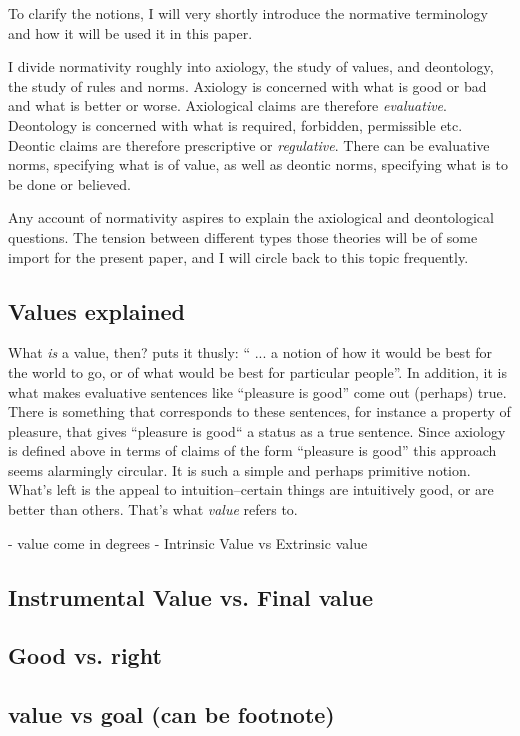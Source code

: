 \documentclass[12pt,numbers=noenddot]{scrartcl}
\begin{document}
To clarify the notions, I will very shortly introduce the normative terminology and how it will be used it in this paper.

I divide normativity roughly into axiology, the study of values, and deontology, the study of rules and norms. Axiology is concerned with what is good or bad and what is better or worse. Axiological claims are therefore \emph{evaluative}. Deontology is concerned with what is required, forbidden, permissible etc. Deontic claims are therefore prescriptive or \emph{regulative}. There can be evaluative norms, specifying what is of value, as well as deontic norms, specifying what is to be done or believed.

Any account of normativity aspires to explain the axiological and deontological questions. The tension between different types those theories will be of some import for the present paper, and I will circle back to this topic frequently.

\subsection{ Values explained }
What \emph{is} a value, then? \textcite[79]{scanlon1998} puts it thusly: “ ... a notion of how it would be best for the world to go, or of what would be best for particular people”. In addition, it is what makes evaluative sentences like “pleasure is good” come out (perhaps) true. There is something that corresponds to these sentences, for instance a property of pleasure, that gives “pleasure is good“ a status as a true sentence. Since axiology is defined above in terms of claims of the form “pleasure is good” this approach seems alarmingly circular. It is such a simple and perhaps primitive notion. What's left is the appeal to intuition–certain things are intuitively good, or are better than others. That's what \emph{value} refers to.

- value come in degrees
- Intrinsic Value vs Extrinsic value

\subsection{ Instrumental Value vs. Final value }
\subsection{ Good vs. right }
\subsection{ value vs goal (can be footnote)}
\end{document}
